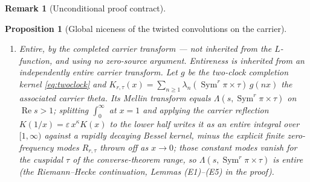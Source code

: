 \documentclass[11pt]{article}
\newtheorem{proposition}[theorem]{Proposition}
\theoremstyle{definition}
\newtheorem{remark}[theorem]{Remark}
\renewcommand{\Re}{\operatorname{Re}}
\newcommand{\Sym}{\operatorname{Sym}}
\begin{document}
\begin{remark}[Unconditional proof contract]
\begin{enumerate}
\begin{proposition}[Global niceness of the twisted convolutions on the carrier]
\begin{enumerate}
it.) The abscissa is $\Re s=\tfrac12$ (\texttt{scaleBalanced\_iff}).
\item[\textup{(E)}] \emph{Entire}, by the completed carrier transform --- \emph{not} inherited from the
$L$-function, and using no zero-source argument. Entireness is inherited from an independently entire
carrier transform. Let $g$ be the two-clock completion kernel \eqref{eq:twoclock} and
$K_{r,\tau}(x)=\sum_{n\ge1}\lambda_n(\Sym^r\pi\times\tau)\,g(nx)$ the associated carrier theta. Its
Mellin transform equals $\Lambda(s,\Sym^r\pi\times\tau)$ on $\Re s>1$; splitting $\int_0^\infty$ at
$x=1$ and applying the carrier reflection $K(1/x)=\varepsilon\,x^{\kappa}K(x)$ to the lower half writes it
as an entire integral over $[1,\infty)$ against a rapidly decaying Bessel kernel, minus the explicit
finite zero-frequency modes $R_{r,\tau}$ thrown off as $x\to0$; those constant modes vanish for the
cuspidal $\tau$ of the converse-theorem range, so $\Lambda(s,\Sym^r\pi\times\tau)$ is entire (the
Riemann--Hecke continuation, Lemmas \textup{(E1)--(E5)} in the proof).
\end{enumerate}
\end{proposition}


\end{enumerate}
\end{remark}
\end{document}
